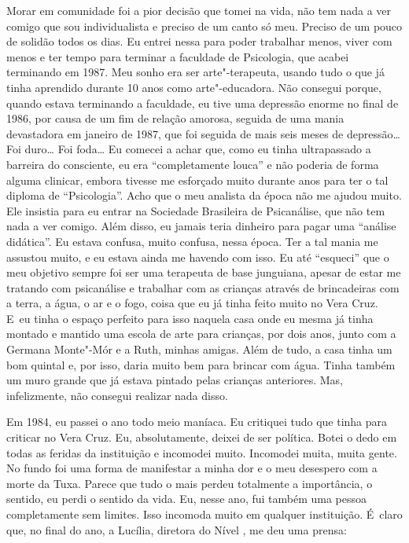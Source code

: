Morar em comunidade foi a pior decisão que tomei na vida, não tem nada a
ver comigo que sou individualista e preciso de um canto só meu. Preciso
de um pouco de solidão todos os dias. Eu entrei nessa para poder
trabalhar menos, viver com menos e ter tempo para terminar a faculdade
de Psicologia, que acabei terminando em 1987. Meu sonho era ser
arte"-terapeuta, usando tudo o que já tinha aprendido durante 10 anos
como arte"-educadora. Não consegui porque, quando estava terminando a
faculdade, eu tive uma depressão enorme no final de 1986, por causa de
um fim de relação amorosa, seguida de uma mania devastadora em janeiro
de 1987, que foi seguida de mais seis meses de depressão… Foi
duro… Foi foda… Eu comecei a achar que, como eu tinha
ultrapassado a barreira do consciente, eu era ``completamente louca'' e
não poderia de forma alguma clinicar, embora tivesse me esforçado muito
durante anos para ter o tal diploma de ``Psicologia''. Acho que o meu
analista da época não me ajudou muito. Ele insistia para eu entrar na
Sociedade Brasileira de Psicanálise, que não tem nada a ver comigo. Além
disso, eu jamais teria dinheiro para pagar uma ``análise didática''. Eu
estava confusa, muito confusa, nessa época. Ter a tal mania me assustou
muito, e eu estava ainda me havendo com isso. Eu até ``esqueci'' que o
meu objetivo sempre foi ser uma terapeuta de base junguiana, apesar de
estar me tratando com psicanálise e trabalhar com as crianças através de
brincadeiras com a terra, a água, o ar e o fogo, coisa que eu já tinha
feito muito no Vera Cruz. E~eu tinha o espaço perfeito para isso naquela
casa onde eu mesma já tinha montado e mantido uma escola de arte para
crianças, por dois anos, junto com a Germana Monte"-Mór e a Ruth, minhas
amigas. Além de tudo, a casa tinha um bom quintal e, por isso, daria
muito bem para brincar com água. Tinha também um muro grande que já
estava pintado pelas crianças anteriores. Mas, infelizmente, não
consegui realizar nada disso.

Em 1984, eu passei o ano todo meio maníaca. Eu critiquei tudo que tinha
para criticar no Vera Cruz. Eu, absolutamente, deixei de ser política.
Botei o dedo em todas as feridas da instituição e incomodei muito.
Incomodei muita, muita gente. No fundo foi uma forma de manifestar a
minha dor e o meu desespero com a morte da Tuxa. Parece que tudo o mais
perdeu totalmente a importância, o sentido, eu perdi o sentido da vida.
Eu, nesse ano, fui também uma pessoa completamente sem limites. Isso
incomoda muito em qualquer instituição. É~claro que, no final do ano, a
Lucília, diretora do Nível , me deu uma prensa:

